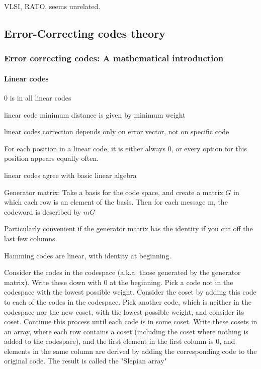 \documentclass{article}
\begin{document}
VLSI, RATO, seems unrelated.


\subsection{Error-Correcting codes theory}

\subsubsection{Error correcting codes: A  mathematical introduction}

\paragraph{Linear codes}

0 is in all linear codes

linear code minimum distance is given by minimum weight

linear codes correction depends only on error vector, not on  specific code

For each position in a linear code, it is either always 0, or every option for this position appears equally often.

linear codes agree with basic linear algebra

Generator matrix: Take a basis for the code space, and create a matrix $G$ in which each row is an element of the basis. Then for each message m, the codeword is described by $m G$

Particularly convenient if the generator matrix has the identity if you cut off the last few columns.

Hamming codes are linear, with identity at beginning.

Consider the codes in the codespace (a.k.a. those generated by the generator matrix). Write these down with 0 at the beginning. Pick a code not in the codespace with the lowest possible weight. Consider the coset by adding this code to each of the codes in the codespace. Pick another code, which is neither in the codespace nor the new coset, with the lowest possible weight, and consider its coset. Continue this process until each code is in some coset. Write these cosets in an array, where each row contains a coset (including the coset where nothing is added to the codespace), and the first element in the first column is 0, and elements in the same column are derived by adding the corresponding code to the original code. The result is called the "Slepian array"
\end{document}
